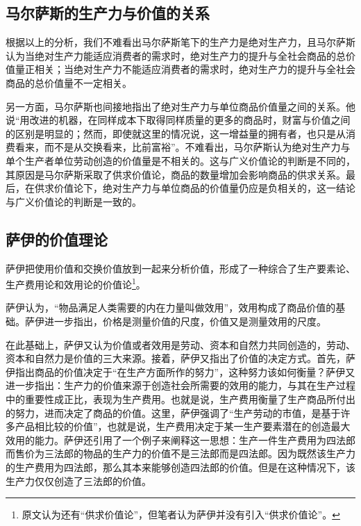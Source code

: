 \subsection{马尔萨斯的生产力与价值的关系}

根据以上的分析，我们不难看出马尔萨斯笔下的生产力是绝对生产力，且马尔萨斯认为当绝对生产力能适应消费者的需求时，绝对生产力的提升与全社会商品的总价值量正相关；当绝对生产力不能适应消费者的需求时，绝对生产力的提升与全社会商品的总价值量不一定相关。

另一方面，马尔萨斯也间接地指出了绝对生产力与单位商品价值量之间的关系。他说“用改进的机器，在同样成本下取得同样质量的更多的商品时，财富与价值之间的区别是明显的；然而，即使就这里的情况说，这一增益量的拥有者，也只是从消费看来，而不是从交换看来，比前富裕”\cite[291]{BiLuo*SiLaFaDaWeiLiJiaTuQuanJiDi2JuanMaErSaSiZhengZhiJingJiXueYuanLiPingZhu2013}。不难看出，马尔萨斯认为绝对生产力与单个生产者单位劳动创造的价值量是不相关的。这与广义价值论的判断是不同的，其原因是马尔萨斯采取了供求价值论，商品的数量增加会影响商品的供求关系。最后，在供求价值论下，绝对生产力与单位商品的价值量仍应是负相关的，这一结论与广义价值论的判断是一致的。

\subsection{萨伊的价值理论}

萨伊把使用价值和交换价值放到一起来分析价值，形成了一种综合了生产要素论、生产费用论和效用论的价值论\footnote{原文认为还有“供求价值论”，但笔者认为萨伊并没有引入“供求价值论”。}\cite[138]{YanZhiJieXiFangJingJiXueShuoShiJiaoChengDiErBan2013}。

萨伊认为，“物品满足人类需要的内在力量叫做效用”，效用构成了商品价值的基础\cite[59]{SaYiZhengZhiJingJiXueGaiLunCaiFuDeShengChanFenPeiHeXiaoFei2020}。萨伊进一步指出，价格是测量价值的尺度，价值又是测量效用的尺度\cite[60]{SaYiZhengZhiJingJiXueGaiLunCaiFuDeShengChanFenPeiHeXiaoFei2020}。

在此基础上，萨伊又认为价值或者效用是劳动、资本和自然力共同创造的\cite[78]{SaYiZhengZhiJingJiXueGaiLunCaiFuDeShengChanFenPeiHeXiaoFei2020}，劳动、资本和自然力是价值的三大来源。接着，萨伊又指出了价值的决定方式。首先，萨伊指出商品的价值决定于“在生产方面所作的努力”\cite[351]{SaYiZhengZhiJingJiXueGaiLunCaiFuDeShengChanFenPeiHeXiaoFei2020}，这种努力该如何衡量？萨伊又进一步指出：生产力的价值来源于创造社会所需要的效用的能力，与其在生产过程中的重要性成正比，表现为生产费用\cite[352]{SaYiZhengZhiJingJiXueGaiLunCaiFuDeShengChanFenPeiHeXiaoFei2020}。也就是说，生产费用衡量了生产商品所付出的努力，进而决定了商品的价值。这里，萨伊强调了“生产劳动的市值，是基于许多产品相比较的价值”\cite[352]{SaYiZhengZhiJingJiXueGaiLunCaiFuDeShengChanFenPeiHeXiaoFei2020}，也就是说，生产费用决定于某一生产要素潜在的创造最大效用的能力。萨伊还引用了一个例子来阐释这一思想：生产一件生产费用为四法郎而售价为三法郎的物品的生产力的价值不是三法郎而是四法郎。因为既然该生产力的生产费用为四法郎，那么其本来能够创造四法郎的价值。但是在这种情况下，该生产力仅仅创造了三法郎的价值\cite[352]{SaYiZhengZhiJingJiXueGaiLunCaiFuDeShengChanFenPeiHeXiaoFei2020}。

